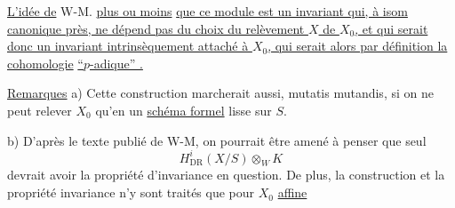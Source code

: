 
\uline{L'idée de} W-M.   \uline{plus ou moins}  \uline{que ce module est un invariant qui, à isom canonique près, ne dépend pas du choix du relèvement $X$ de $X_0$, et qui serait donc un invariant intrinsèquement attaché à $X_0$, qui serait alors par définition la cohomologie}  \uline{``$p$-adique'' .}


\uline{Remarques} a) Cette construction marcherait aussi, mutatis mutandis, si on ne peut relever $X_0$ qu'en un \uline{schéma formel} lisse sur $S$.

b) D'après le texte publié de W-M,  on pourrait  être amené à penser que seul
\[
H^i_{\mathrm{DR}}(X/S)\otimes_W K
\]
 devrait avoir la propriété d'invariance en question. De plus, la construction et la propriété invariance n'y sont traités que pour $X_0$ \uline{affine}

